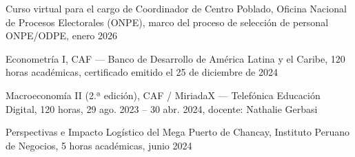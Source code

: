 \begin{scholarship}


  {Curso virtual para el cargo de Coordinador de Centro Poblado,
   Oficina Nacional de Procesos Electorales (ONPE),
   marco del proceso de selección de personal ONPE/ODPE, enero 2026}


  {Econometría I, CAF --- Banco de Desarrollo de América Latina y el Caribe,
   120 horas académicas, certificado emitido el 25 de diciembre de 2024}

  {Macroeconomía II (2.ª edición), CAF / MiriadaX --- Telefónica Educación Digital,
   120 horas, 29 ago. 2023 -- 30 abr. 2024, docente: Nathalie Gerbasi}

  {Perspectivas e Impacto Logístico del Mega Puerto de Chancay,
   Instituto Peruano de Negocios, 5 horas académicas, junio 2024}








\end{scholarship}
